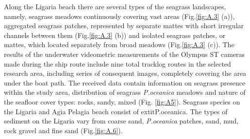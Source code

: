 \documentclass[11pt]{article}
\begin{document}
Along the Ligaria beach there are several types of the seagrass landscapes, namely, seagrass meadows
continuously covering vast areas (Fig.\ref{fig:A.3} (a)), aggregated seagrass patches, represented by separate mattes with short irregular channels between them (Fig.\ref{fig:A.3} (b)) and isolated seagrass patches, or mattes,
which located separately from broad meadows (Fig.\ref{fig:A.3} (c)).
The results of the underwater videometric measurements of the \ac{Olympus ST} cameras made during the
ship route include nine total tracklog routes in the selected research area, including series of
consequent images, completely covering the area under the boat path. The received data contain
information on seagrass presence within the study area, distribution of seagrass \textit{P.oceanica} meadows
and nature of the seafloor cover types: rocks, sandy, mixed (Fig. \ref{fig:A5}). Seagrass species on the Ligaria and Agia
Pelagia beach consist of 	extit{P.oceanica}. The types of sediment on the Ligaria vary from coarse sand,
\textit{P.oceanica} patches, sand, mud, rock gravel and fine sand (Fig.\ref{fig:A.6}).
\end{document}

